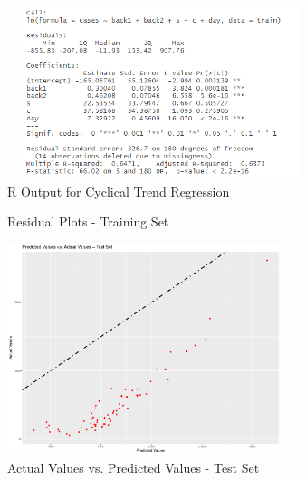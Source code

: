 \documentclass{article}
\begin{document}
\begin{figure}[h]
    \centering
    \includegraphics[width=9cm,height=5cm]{graphs/cyc_train_output.png}
    \caption{R Output for Cyclical Trend Regression}
    \label{cyc_output}
\end{figure}

\begin{figure}[h]
    \centering
    \caption{Residual Plots - Training Set}
    \label{cyc_resid}
\end{figure}

\begin{figure}[h]
    \centering
    \includegraphics[width=8cm]{graphs/cyc_test.pdf}
    \caption{Actual Values vs. Predicted Values - Test Set}
    \label{cyc_train}
\end{figure}
\end{document}
